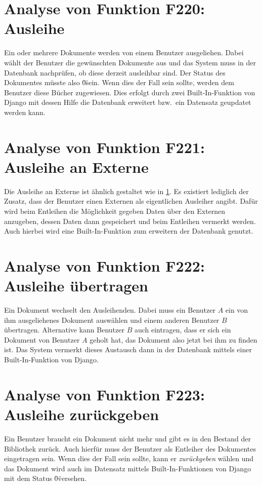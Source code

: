 \section{Analyse von Funktion F220: Ausleihe}
\label{f:220}
Ein oder mehrere Dokumente werden von einem Benutzer ausgeliehen. Dabei wählt der Benutzer die gewünschten Dokumente aus und das System muss in der Datenbank nachprüfen, ob diese derzeit ausleihbar sind. Der Status des Dokumentes müsste also \"0\" sein. Wenn dies der Fall sein sollte, werden dem Benutzer diese Bücher zugewiesen. Dies erfolgt durch zwei Built-In-Funktion von Django mit dessen Hilfe die Datenbank erweitert bzw.\ ein Datensatz geupdatet werden kann.

\section{Analyse von Funktion F221: Ausleihe an Externe}
Die Ausleihe an Externe ist ähnlich gestaltet wie in \ref{f:220}. Es existiert lediglich der Zusatz, dass der Benutzer einen Externen als eigentlichen Ausleiher angibt. Dafür wird beim Entleihen die Möglichkeit gegeben Daten über den Externen anzugeben, dessen Daten dann gespeichert und beim Entleihen vermerkt werden. Auch hierbei wird eine Built-In-Funktion zum erweitern der Datenbank genutzt.

\section{Analyse von Funktion F222: Ausleihe übertragen}
Ein Dokument wechselt den Ausleihenden. Dabei muss ein Benutzer $A$ ein von ihm ausgeliehenes Dokument auswählen und einem anderen Benutzer $B$ übertragen. Alternative kann Benutzer $B$ auch eintragen, dass er sich ein Dokument von Benutzer $A$ geholt hat, das Dokument also jetzt bei ihm zu finden ist. Das System vermerkt dieses Austausch dann in der Datenbank mittels einer Built-In-Funktion von Django. 

\section{Analyse von Funktion F223: Ausleihe zurückgeben}
Ein Benutzer braucht ein Dokument nicht mehr und gibt es in den Bestand der Bibliothek zurück. Auch hierfür muss der Benutzer als Entleiher des Dokumentes eingetragen sein. Wenn dies der Fall sein sollte, kann er \emph{zurückgeben} wählen und das Dokument wird auch im Datensatz mittels Built-In-Funktionen von Django mit dem Status \"0\" versehen.

